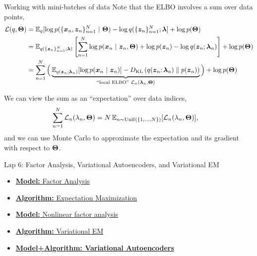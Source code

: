 \documentclass[aspectratio=169]{beamer}
\begin{document}
\begin{frame}{Working with mini-batches of data}
Note that the ELBO involves a sum over data points,
\begin{align}
    \mathcal{L}(q, \boldsymbol{\Theta}) &= \mathbb{E}_q [\log p(\{\boldsymbol{x}_n, \boldsymbol{z}_n\}_{n=1}^N ~\vert~ \boldsymbol{\Theta}) - \log q(\{\boldsymbol{z}_n\}_{n=1}^N; \boldsymbol{\lambda}] + \log p(\boldsymbol{\Theta}) \\
    &= \mathbb{E}_{q(\{\boldsymbol{z}_n\}_{n=1}^N; \boldsymbol{\lambda})} \left[\sum_{n=1}^N \log p(\boldsymbol{x}_n ~\vert~ \boldsymbol{z}_n, \boldsymbol{\Theta}) + \log p(\boldsymbol{z}_n) - \log q(\boldsymbol{z}_n; \boldsymbol{\lambda}_n) \right] + \log p(\boldsymbol{\Theta})
    \\
    &= \sum_{n=1}^N \Big(\underbrace{\mathbb{E}_{q(\boldsymbol{z}_n; \boldsymbol{\lambda}_n)}[\log p(\boldsymbol{x}_n ~\vert~ \boldsymbol{z}_n)] - D_{\textrm{KL}}\left(q(\boldsymbol{z}_n; \boldsymbol{\lambda}_n)\;\|\;p(\boldsymbol{z}_n)\right)}_{\text{``local ELBO'' } \mathcal{L}_n(\boldsymbol{\lambda}_n, \boldsymbol{\Theta})} \Big) + \log p(\boldsymbol{\Theta})
\end{align}

We can view the sum as an ``expectation'' over data indices,
\begin{align}
    \sum_{n=1}^N \mathcal{L}_n(\lambda_n, \boldsymbol{\Theta}) &= N \, \mathbb{E}_{n \sim \mathrm{Unif}(\{1,\ldots,N\})}[\mathcal{L}_n(\lambda_n, \boldsymbol{\Theta})],
\end{align}
and we can use Monte Carlo to approximate the expectation and its gradient with respect to $\boldsymbol{\Theta}$.
    
\end{frame}

\begin{frame}{Lap 6: Factor Analysis, Variational Autoencoders, and Variational EM}
\begin{itemize}
    \item \hyperref[sec:fa]{\textbf{Model:} Factor Analysis}
    \item \hyperref[sec:em]{\textbf{Algorithm:} Expectation Maximization}
    \item \hyperref[sec:vaes]{\textbf{Model:} Nonlinear factor analysis}
    \item \hyperref[sec:vem]{\textbf{Algorithm:} Variational EM}
    \item \hyperref[sec:vaes]{\textbf{Model+Algorithm: Variational Autoencoders}}
\end{itemize}
\end{frame}
\end{document}
